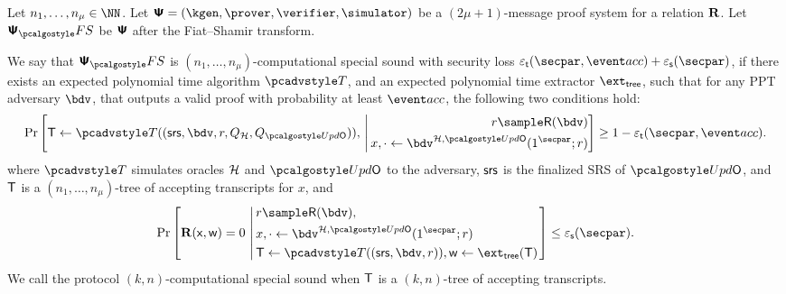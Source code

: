 \begin{definition}
	Let $n_1, \ldots, n_\mu \in \NN$. Let $\proofsystem = (\kgen, \prover, \verifier, \simulator)$ be a $(2 \mu + 1)$-message proof system for a relation $\mathbf{R}$. Let $\proofsystem_\fs$ be $\bm{\mathsf{\Psi}}$ after the Fiat--Shamir transform. 
	
	We say that $\psfs$ is $(n_1, \ldots, n_\mu)$-computational special sound with security loss $\epst (\secpar, \accProb) + \epss(\secpar)$, if there exists an expected polynomial time algorithm $\tdv$, and an expected polynomial time extractor $\extt$, such that for any PPT adversary $\bdv$, that outputs a valid proof with probability at least $\accProb$, the following two conditions hold:
	\begin{align*}
	\Pr\left[
  	\tree \gets \tdv((\srs,\bdv,r, Q_\ro,Q_{\initU})),
	\,\Biggl|\,
	\begin{aligned}
		 r \sample \RND{\bdv} \\
		 x, \cdot \gets \bdv^{\ro, \initU} (1^\secpar; r)
	\end{aligned}
	\right] \geq 1 - \epst(\secpar, \accProb).
	\end{align*}
where $\tdv$ simulates oracles $\mathcal{H}$ and $\initU$ to the adversary, $\mathsf{srs}$ is the finalized SRS of $\initU$, and $\mathsf{T}$ is a $(n_1, \ldots, n_\mu)$-tree of accepting transcripts for $x$, and
	\begin{align*}
	\Pr\left[
	\REL(\inp, \wit) = 0
	\,\left|\,
	\begin{aligned}
	& 	r \sample \RND{\bdv}, \\
	& 	x, \cdot \gets \bdv^{\ro, \initU} (1^\secpar; r)\\
	&  	\tree \gets \tdv((\srs,\bdv,r)),
	\wit \gets \extt(\tree)
	\end{aligned}\right.
	\right] \leq \epss(\secpar).
	\end{align*}
	 We call the protocol $(k, n)$-computational special sound when $\mathsf{T}$ is a $(k, n)$-tree of accepting transcripts.
\end{definition}

